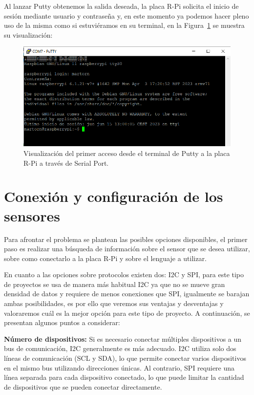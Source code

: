 Al lanzar Putty obtenemos la salida deseada, la placa R-Pi solicita el inicio de sesión mediante usuario y contraseña y, en este momento ya podemos hacer pleno uso de la misma como si estuviéramos en su terminal, en la Figura~\ref{fig:puttyOK} se muestra su visualización:

\begin{figure}[tbh]
\centering
\includegraphics[scale=0.9]{images/puttyOK.png}
\caption[Primer acceso de Putty a Raspberry-Pi]{Visualización del primer acceso desde el terminal de Putty a la placa R-Pi a través de Serial Port.}%
\label{fig:puttyOK}
\end{figure}


\section{Conexión y configuración de los sensores}

Para afrontar el problema se plantean las posibles opciones disponibles, el primer paso es realizar una búsqueda de información sobre el sensor que se desea utilizar, sobre como conectarlo a la placa R-Pi y sobre el lenguaje a utilizar.

En cuanto a las opciones sobre protocolos existen dos: I2C y SPI, para este tipo de proyectos se usa de manera más habitual I2C ya que no se mueve gran densidad de datos y requiere de menos conexiones que SPI, igualmente se barajan ambas posibilidades, es por ello que veremos sus ventajas y desventajas y valoraremos cuál es la mejor opción para este tipo de proyecto. A continuación, se presentan algunos puntos a considerar:

\textbf{Número de dispositivos:} Si es necesario conectar múltiples dispositivos a un bus de comunicación, I2C generalmente es más adecuado. I2C utiliza solo dos líneas de comunicación (SCL y SDA), lo que permite conectar varios dispositivos en el mismo bus utilizando direcciones únicas. Al contrario, SPI requiere una línea separada para cada dispositivo conectado, lo que puede limitar la cantidad de dispositivos que se pueden conectar directamente.

